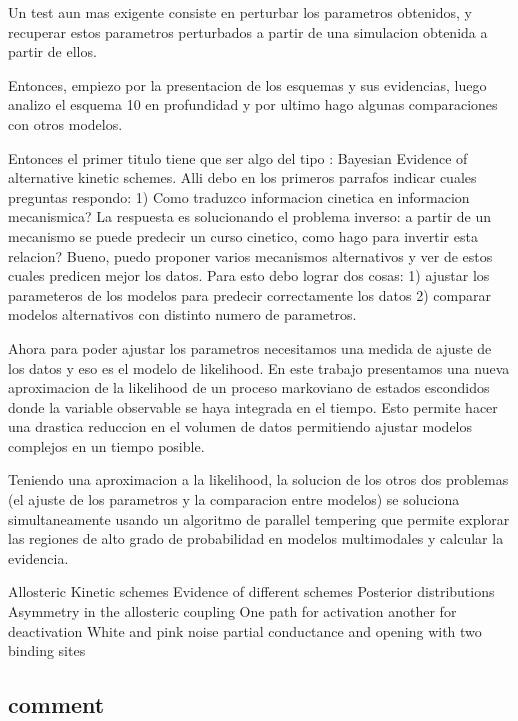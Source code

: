 \documentclass[a4paper,12pt]{article}
\begin{document}
		Un test aun mas exigente consiste en perturbar los parametros obtenidos, y recuperar estos parametros perturbados a partir de una simulacion obtenida a partir de ellos. 
		
		Entonces, empiezo por la presentacion de los esquemas y sus evidencias, luego analizo el esquema 10 en profundidad y por ultimo hago algunas comparaciones con otros modelos. 
		
		
		Entonces el primer titulo tiene que ser algo del tipo : Bayesian Evidence of alternative kinetic schemes. 
		Alli debo en los primeros parrafos indicar cuales preguntas respondo: 
		1) Como traduzco informacion cinetica en informacion mecanismica? 
		La respuesta es solucionando el problema inverso: a partir de un mecanismo se puede predecir un curso cinetico, como hago para invertir esta relacion?
		Bueno, puedo proponer varios mecanismos alternativos y ver de estos cuales predicen mejor los datos. 
		Para esto debo lograr dos cosas: 1) ajustar los parameteros de los modelos para predecir correctamente los datos
		2) comparar modelos alternativos con distinto numero de parametros. 
		
		Ahora para poder ajustar los parametros necesitamos una medida de ajuste de los datos y eso es el modelo de likelihood. En este trabajo presentamos una nueva aproximacion de la likelihood de un proceso markoviano de estados escondidos donde la variable observable se haya integrada en el tiempo. Esto permite hacer una drastica reduccion en el volumen de datos permitiendo ajustar modelos complejos en un tiempo posible. 
		
		Teniendo una aproximacion a la likelihood, la solucion de los otros dos problemas (el ajuste de los parametros y la comparacion entre modelos) se soluciona simultaneamente usando un algoritmo de parallel tempering que permite explorar las regiones de alto grado de probabilidad en modelos multimodales y calcular la evidencia. 
		
		
		
		Allosteric Kinetic schemes 
		Evidence of different schemes
		Posterior distributions
		Asymmetry in the allosteric coupling
		One path for activation another for deactivation
		White and pink noise
		partial conductance and opening with two binding sites
		
		
		
		
	
	
	
	\subsection{comment}
		
\end{document}
